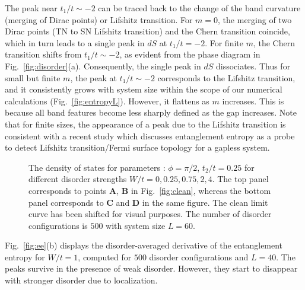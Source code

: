 \documentclass[aps,prb,showpacs,twocolumn,floats]{revtex4-1}
\begin{document}
The peak near  $t_1/t\sim-2$ can be traced back to the change of the band curvature (merging of Dirac points) or Lifshitz transition. For $m=0$, the merging of two Dirac points (TN to SN Lifshitz transition) and the Chern transition coincide, which in turn leads to a single peak in $dS$ at $t_1/t=-2$. For finite $m$, the Chern transition shifts from $t_1/t\sim-2$, as evident from the phase diagram in Fig.~\ref{fig:disorder}(a). Consequently, the single peak in $dS$ dissociates. Thus for small but finite $m$, the peak at $t_1/t\sim-2$ corresponds to the Lifshitz transition, and it consistently grows with system size within the scope of our numerical calculations (Fig.~\ref{fig:entropyL}). However, it flattens as $m$ increases. This is because all band features become less sharply defined as the gap increases. Note that for finite sizes, the appearance of a peak due to the Lifshitz transition is consistent with a recent study \cite{sun-sik} which discusses entanglement entropy as a probe to detect Lifshitz transition/Fermi surface topology for a gapless system. 
 
\begin{figure}
\caption{The density of states for parameters : $\phi = \pi/2$, $t_2/t = 0.25$ for different disorder strengths $W/t = 0,0.25,0.75,2,4$. The top panel corresponds to points {\bf A}, {\bf B} in Fig.~\ref{fig:clean}, whereas the bottom panel corresponds to {\bf C} and {\bf D} in the same figure. The clean limit curve has been shifted for visual purposes. The number of disorder configurations is $500$ with system size $L = 60$. }
\label{fig:dos_lattice}
\end{figure}

Fig.~\ref{fig:ee}(b) displays the disorder-averaged derivative of the entanglement entropy for $W/t=1$, computed for $500$ disorder configurations and $L=40$. The peaks survive in the presence of weak disorder. However, they start to disappear with stronger disorder due to localization. 
\end{document}
